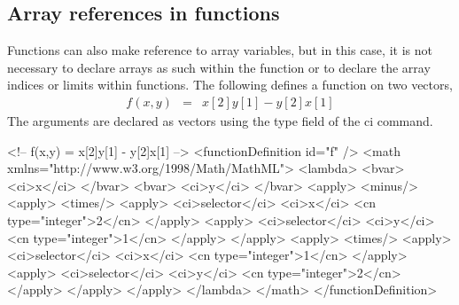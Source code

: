 \subsection{Array references in functions}

Functions can also make reference to array variables, but in this case, it is not necessary to declare arrays as such within the function or to declare the array indices or limits within functions.  The following defines a function on two vectors, 
\begin{eqnarray*}
f(x,y) & = & x[2]y[1] - y[2]x[1]
\end{eqnarray*}
The arguments are declared as vectors using the type field of the ci command.

\begin{example}
<!-- f(x,y) = x[2]y[1] - y[2]x[1] -->
<functionDefinition id="f" />
 <math xmlns="http://www.w3.org/1998/Math/MathML">
  <lambda>
   <bvar>
    <ci>x</ci>
   </bvar>
   <bvar>
    <ci>y</ci>
   </bvar>
   <apply>
     <minus/>
       <apply>
         <times/>
           <apply>
             <ci>selector</ci>
             <ci>x</ci>
             <cn type="integer">2</cn>
           </apply>
           <apply>
             <ci>selector</ci>
             <ci>y</ci>
             <cn type="integer">1</cn>
           </apply>
       </apply>
       <apply>
         <times/>
           <apply>
             <ci>selector</ci>
             <ci>x</ci>
             <cn type="integer">1</cn>
           </apply>
           <apply>
             <ci>selector</ci>
             <ci>y</ci>
             <cn type="integer">2</cn>
           </apply>
       </apply>
   </apply>
  </lambda>
 </math>
</functionDefinition>
\end{example}
